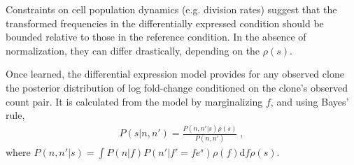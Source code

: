 \documentclass[letterpaper,english,prl,reprint,longbibliography]{revtex4-1} %
\begin{document}
Constraints on cell population dynamics (e.g. division rates) suggest that the transformed frequencies in the differentially expressed condition should be bounded relative to those in the reference condition. 
In the absence of normalization, they can differ drastically, depending on the $\rho(s)$.


Once learned, the differential expression model provides for any observed clone the posterior distribution of log fold-change conditioned on the clone's observed count pair. 
It is calculated from the model by marginalizing $f$, and using Bayes' rule, 
\begin{align}
	P(s|n,n')=\frac{P(n,n'|s)\rho(s)}{P(n,n')}\;,
\end{align}
where $P(n,n'|s)=\int P(n|f)P(n'|f'=fe^s)\rho(f)\textrm{d}f\rho(s)$. 
\end{document}
